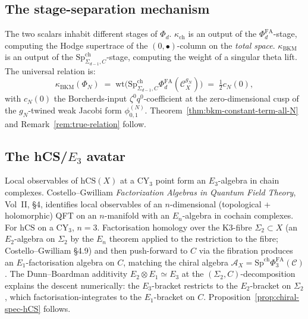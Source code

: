 \documentclass[11pt]{article}
\newcommand{\cA}{\mathcal{A}}
\newcommand{\cC}{\mathcal{C}}
\newcommand{\wt}{\mathrm{wt}}
\newcommand{\hCS}{\mathrm{hCS}}
\begin{document}
\subsection*{The stage-separation mechanism}
The two scalars inhabit different stages of $\Phi_d$.
$\kappa_{\mathrm{ch}}$ is an output of
the $\Phi^{\mathrm{FA}}_d$-stage, computing the Hodge supertrace of
the $(0,\bullet)$-column on the \emph{total space}.
$\kappa_{\mathrm{BKM}}$ is an output of the
$\mathrm{Sp}^{\mathrm{ch}}_{\Sigma_{d-1},C}$-stage, computing the
weight of a singular theta lift. The universal relation is:
\[
  \kappa_{\mathrm{BKM}}(\Phi_N)
  \;=\;
  \wt\bigl(\mathrm{Sp}^{\mathrm{ch}}_{\Sigma_{d-1},C}
    \Phi^{\mathrm{FA}}_d(\cC_X^{g_N})\bigr)
  \;=\;
  \tfrac{1}{2}c_N(0),
\]
with $c_N(0)$ the Borcherds-input $\zeta^0 q^0$-coefficient at the
zero-dimensional cusp of the $g_N$-twined weak Jacobi form
$\phi_{0,1}^{(N)}$. Theorem~\ref{thm:bkm-constant-term-all-N} and
Remark~\ref{rem:true-relation} follow.

\subsection*{The hCS/$E_3$ avatar}
Local observables of $\hCS(X)$ at a CY$_3$ point form an
$E_3$-algebra in chain complexes. Costello--Gwilliam
\emph{Factorization Algebras in
Quantum Field Theory}, Vol~II, \S 4, identifies local observables of
an $n$-dimensional (topological + holomorphic) QFT on an $n$-manifold
with an $E_n$-algebra in cochain complexes. For $\hCS$ on a CY$_3$,
$n=3$. Factorisation homology over the K3-fibre
$\Sigma_2\subset X$ (an $E_2$-algebra on $\Sigma_2$ by the $E_n$
theorem applied to the restriction to the fibre; Costello--Gwilliam
\S 4.9) and then push-forward to $C$ via the fibration produces an
$E_1$-factorisation algebra on $C$, matching the chiral algebra
$\cA_X=\mathrm{Sp}^{\mathrm{ch}}\Phi^{\mathrm{FA}}_3(\cC)$. The
Dunn--Boardman additivity $E_2\otimes E_1\simeq E_3$ at the
$(\Sigma_2,C)$-decomposition explains the descent numerically:
the $E_3$-bracket restricts to the $E_2$-bracket on $\Sigma_2$,
which factorisation-integrates to the $E_1$-bracket on $C$.
Proposition~\ref{prop:chiral-spec-hCS} follows.
\end{document}
